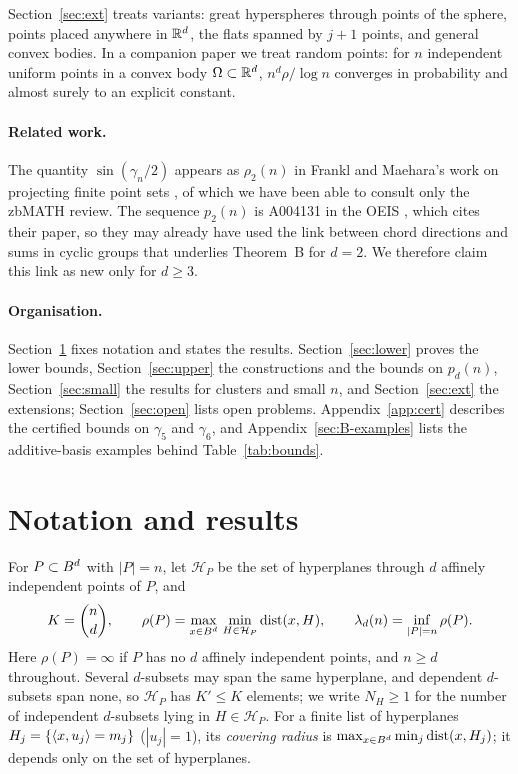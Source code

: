 \documentclass[11pt]{article}
\begin{document}
Section~\ref{sec:ext} treats variants: great hyperspheres through points of the sphere, points placed anywhere in
$\mathbb{R}^d$, the flats spanned by $j+1$ points, and general convex bodies. In a companion paper \cite{Companion} we treat
random points: for $n$ independent uniform points in a convex body $\Omega\subset\mathbb{R}^d$, $n^d\rho/\log n$ converges in
probability and almost surely to an explicit constant.

\paragraph{Related work.} The quantity $\sin(\gamma_n/2)$ appears as $\rho_2(n)$ in Frankl and Maehara's work on
projecting finite point sets \cite{FM}, of which we have been able to consult only the zbMATH review. The sequence $p_2(n)$ is A004131 in the OEIS \cite{OEIS}, which cites their paper, so they may already have
used the link between chord directions and sums in cyclic groups that underlies Theorem~B for $d=2$. We therefore
claim this link as new only for $d\ge3$.

\paragraph{Organisation.} Section~\ref{sec:results} fixes notation and states the results.
Section~\ref{sec:lower} proves the lower bounds, Section~\ref{sec:upper} the constructions and the bounds
on $p_d(n)$, Section~\ref{sec:small} the results for clusters and small $n$, and Section~\ref{sec:ext} the
extensions; Section~\ref{sec:open} lists open problems. Appendix~\ref{app:cert} describes the certified bounds on
$\gamma_5$ and $\gamma_6$, and Appendix~\ref{sec:B-examples} lists the additive-basis examples behind
Table~\ref{tab:bounds}.

\section{Notation and results}\label{sec:results}

For $P\subset B^d$ with $|P|=n$, let $\mathcal H_P$ be the set of hyperplanes through $d$ affinely
independent points of $P$, and
\[
K=\binom nd,\qquad \rho(P)=\max_{x\in B^d}\,\min_{H\in\mathcal H_P}\operatorname{dist}(x,H),\qquad
\lambda_d(n)=\inf_{|P|=n}\rho(P).
\]
Here $\rho(P)=\infty$ if $P$ has no $d$ affinely independent points, and $n\ge d$ throughout. Several
$d$-subsets may span the same hyperplane, and dependent $d$-subsets span none, so $\mathcal H_P$ has
$K'\le K$ elements; we write $N_H\ge1$ for the number of independent $d$-subsets lying in
$H\in\mathcal H_P$.
For a finite list of hyperplanes $H_j=\{\langle x,u_j\rangle=m_j\}$ ($|u_j|=1$), its \emph{covering radius} is
$\max_{x\in B^d}\min_j\operatorname{dist}(x,H_j)$; it depends only on the set of hyperplanes.
\end{document}
